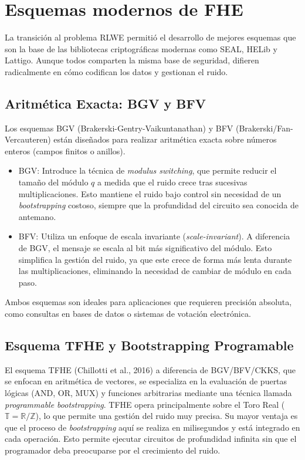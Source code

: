\section{Esquemas modernos de FHE}

La transición al problema RLWE permitió el desarrollo de mejores esquemas que son la base de las bibliotecas criptográficas modernas como SEAL, HELib y Lattigo. Aunque todos comparten la misma base de seguridad, difieren radicalmente en cómo codifican los datos y gestionan el ruido.

\subsection{Aritmética Exacta: BGV y BFV}

Los esquemas BGV (Brakerski-Gentry-Vaikuntanathan) \cite{BGV12} y BFV (Brakerski/Fan-Vercauteren) \cite{FV12} están diseñados para realizar aritmética exacta sobre números enteros (campos finitos o anillos).

\begin{itemize}

\item BGV: Introduce la técnica de \textit{modulus switching}, que permite reducir el tamaño del módulo $q$ a medida que el ruido crece tras sucesivas multiplicaciones. Esto mantiene el ruido bajo control sin necesidad de un \textit{bootstrapping} costoso, siempre que la profundidad del circuito sea conocida de antemano.

\item BFV: Utiliza un enfoque de escala invariante (\textit{scale-invariant}). A diferencia de BGV, el mensaje se escala al bit más significativo del módulo. Esto simplifica la gestión del ruido, ya que este crece de forma más lenta durante las multiplicaciones, eliminando la necesidad de cambiar de módulo en cada paso.

\end{itemize}

Ambos esquemas son ideales para aplicaciones que requieren precisión absoluta, como consultas en bases de datos o sistemas de votación electrónica.

\subsection{Esquema TFHE y Bootstrapping Programable}

El esquema TFHE (Chillotti et al., 2016) \cite{TFHE16} a diferencia de BGV/BFV/CKKS, que se enfocan en aritmética de vectores, se especializa en la evaluación de puertas lógicas (AND, OR, MUX) y funciones arbitrarias mediante una técnica llamada \textit{programmable bootstrapping}. TFHE opera principalmente sobre el Toro Real ($\mathbb{T} = \mathbb{R}/\mathbb{Z}$), lo que permite una gestión del ruido muy precisa. Su mayor ventaja es que el proceso de \textit{bootstrapping} aquí se realiza en milisegundos y está integrado en cada operación. Esto permite ejecutar circuitos de profundidad infinita sin que el programador deba preocuparse por el crecimiento del ruido.

